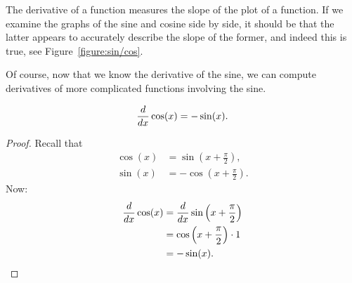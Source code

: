 The derivative of a function measures the slope of the plot of a
function.  If we examine the graphs of the sine and cosine side by
side, it should be that the latter appears to accurately describe the
slope of the former, and indeed this is true, see
Figure~\ref{figure:sin/cos}.
\begin{figure*}
\caption{Here we see a plot of $f(x)=\sin(x)$ and its derivative
  $f'(x)=\cos(x)$. One can readily see that $\cos(x)$ is positive when
  $\sin(x)$ is increasing, and that $\cos(x)$ is negative when
  $\sin(x)$ is decreasing.}
\label{figure:sin/cos}
\end{figure*}

Of course, now that we know the derivative of the sine, we can compute
derivatives of more complicated functions involving the sine.


\begin{theorem}
\[
\frac{d}{dx} \cos(x) = -\sin(x).
\]
\end{theorem}

\begin{proof}
Recall that
\begin{align*}
\cos(x) &= \sin\left(x+\frac{\pi}{2}\right), \\
\sin(x) &= -\cos\left(x+\frac{\pi}{2}\right).
\end{align*}
Now:
\begin{align*}
\frac{d}{dx} \cos(x) &= \frac{d}{dx} \sin\left(x+\frac{\pi}{2}\right)\\
&=\cos\left(x+\frac{\pi}{2}\right)\cdot 1 \\
&= -\sin(x).
\end{align*}
\end{proof}

